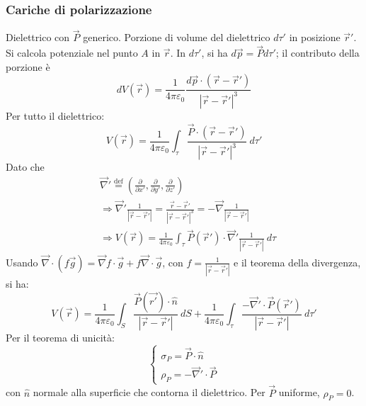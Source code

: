 \documentclass[10pt, a4paper]{scrartcl}
\numberwithin{equation}{subsection}
\theoremstyle{style1}
\begin{document}
\subsubsection{Cariche di polarizzazione}
Dielettrico con $\vec{P}$ generico. Porzione di volume del dielettrico $d\tau '$ in posizione $\vec{r}'$. Si calcola potenziale nel punto $A$ in $\vec{r}$. In $d\tau '$, si ha $d\vec{p} = \vec{P}d\tau '$; il contributo della porzione \`e
\begin{equation}
	dV(\vec{r}) = \frac{1}{4\pi \varepsilon _0} \frac{d\vec{p}\cdot (\vec{r}-\vec{r}')}{\left\lvert \vec{r}-\vec{r}' \right\rvert^3}
\end{equation}
Per tutto il dielettrico:
\begin{equation}
	V(\vec{r}) = \frac{1}{4\pi \varepsilon _0} \int_{\tau }  \frac{\vec{P}\cdot (\vec{r}-\vec{r}')}{\left\lvert \vec{r}-\vec{r}' \right\rvert ^3}\ d\tau '
\end{equation}
Dato che
\begin{equation}
	\begin{split}
		&\vec{\nabla }' \overset{\text{def}}{=} \left(\frac{\partial }{\partial x'} , \frac{\partial }{\partial y'}, \frac{\partial }{\partial z'} \right) \\
		&\Rightarrow \vec{\nabla }' \frac{1}{\left\lvert \vec{r}-\vec{r}' \right\rvert } = \frac{\vec{r}-\vec{r}'}{\left\lvert \vec{r}-\vec{r}' \right\rvert ^3} = - \vec{\nabla } \frac{1}{\left\lvert \vec{r}-\vec{r}' \right\rvert}\\
		&\Rightarrow V(\vec{r}) = \frac{1}{4\pi \varepsilon _0}\int_{\tau } \vec{P}(\vec{r}') \cdot \vec{\nabla }' \frac{1}{\left\lvert \vec{r}- \vec{r}'\right\rvert}\ d\tau 
	\end{split}
\end{equation}
Usando $\vec{\nabla }\cdot (f\vec{g}) = \vec{\nabla }f \cdot \vec{g} + f\vec{\nabla }\cdot \vec{g}$, con $f = \frac{1}{\left\lvert \vec{r}- \vec{r}'\right\rvert }$ e il teorema della divergenza, si ha:
\begin{equation}
	V(\vec{r}) = \frac{1}{4 \pi \varepsilon _0}\int_{S} \frac{\vec{P}(\vec{r'})\cdot \hat{n}}{\left\lvert \vec{r}-\vec{r}' \right\rvert } \ dS + \frac{1}{4\pi \varepsilon _0} \int_{\tau } \frac{- \vec{\nabla }'\cdot \vec{P}(\vec{r}')}{\left\lvert \vec{r}-\vec{r}' \right\rvert }\ d\tau '
\end{equation}
Per il teorema di unicit\`a:
\begin{equation}
	\begin{cases}
		\sigma _P = \vec{P}\cdot \hat{n}\\
		\rho _P = - \vec{\nabla }'\cdot \vec{P}
	\end{cases}
\end{equation}
con $\hat{n}$ normale alla superficie che contorna il dielettrico. Per $\vec{P}$ uniforme, $\rho _P = 0$.
\end{document}

